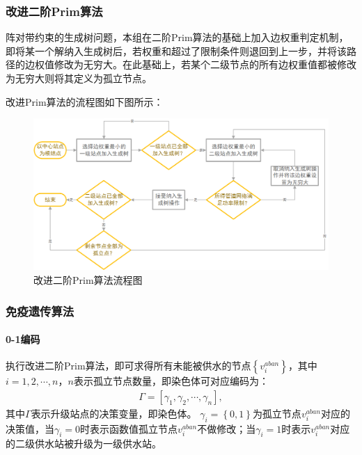 \documentclass{whutmod}
\begin{document}
    	  	\subsubsection{改进二阶Prim算法}
    	阵对带约束的生成树问题，本组在二阶Prim算法的基础上加入边权重判定机制，即将某一个解纳入生成树后，若权重和超过了限制条件则退回到上一步，并将该路径的边权值修改为无穷大。在此基础上，若某个二级节点的所有边权重值都被修改为无穷大则将其定义为孤立节点。
    	
    	改进Prim算法的流程图如下图所示：
        \begin{figure}[H]
        	\centering
        	\includegraphics[width=\textwidth]{figures/a3.png}
        	\caption{改进二阶Prim算法流程图}\label{asd}
        \end{figure}
        
    		
  	
  	\subsubsection{免疫遗传算法}
  	\paragraph{0-1编码}
  	执行改进二阶Prim算法，即可求得所有未能被供水的节点$\left \{ v_i^{aban} \right \}$，其中$i=1,2,\cdots,n$，$n$表示孤立节点数量，即染色体可对应编码为：
  		\begin{gather}
  		\Gamma =[\gamma_1,\gamma_2,\cdots, \gamma_n],
  		\end{gather}
    其中$\Gamma$表示升级站点的决策变量，即染色体。 $\gamma_i=\left \{ 0,1 \right \}$为孤立节点$v_i^{aban}$对应的决策值，当$\gamma_i=0$时表示函数值孤立节点$v_i^{aban}$不做修改；当$\gamma_i=1$时表示$v_i^{aban}$对应的二级供水站被升级为一级供水站。
\end{document}
